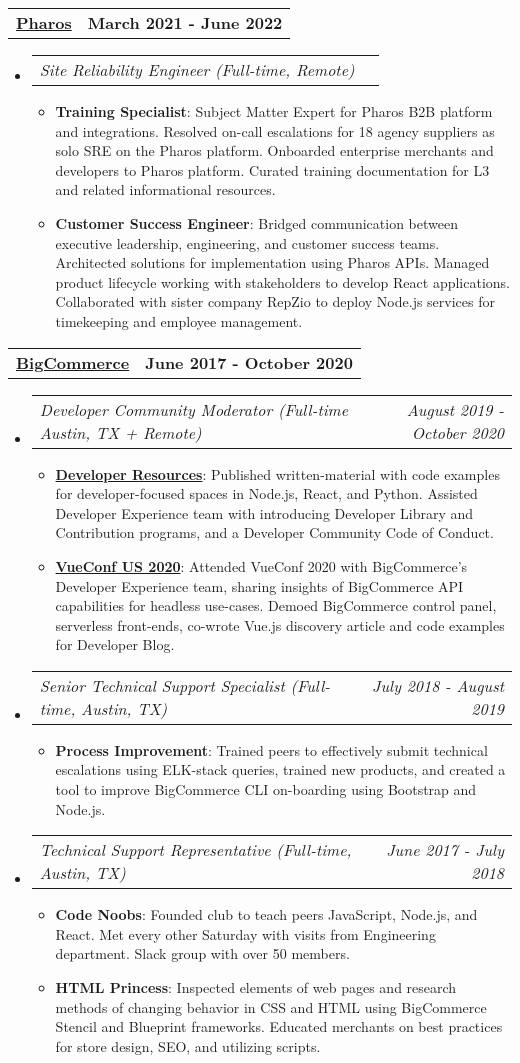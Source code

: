 \documentclass[letterpaper,10.8pt]{article}
\makeatletter
\newcommand{\resumeItem}[2]{
  \item\small{
    \textbf{#1}{: #2 \vspace{-2pt}}
  }
}
\newcommand{\jobLineItem}[2]{
  \vspace{0pt}\item[]
    \begin{tabular*}{0.98\textwidth}{l@{\extracolsep{\fill}}r}
      \textit{#1} & \textit{\small #2} \\
    \end{tabular*}\vspace{-4pt}
}
\newcommand{\employerTitle}[3]{
  \begin{tabular*}{1\textwidth}{l@{\extracolsep{\fill}}r}
    \href{#1}{\textbf{#2}} & \textbf{#3} \\
  \end{tabular*}\vspace{-4pt}
}
\newcommand{\resumeSubHeadingListStart}{\begin{itemize}[leftmargin=*]}
\newcommand{\resumeSubHeadingListEnd}{\end{itemize}}
\newcommand{\resumeItemListStart}{\begin{itemize}}
\newcommand{\resumeItemListEnd}{\end{itemize}\vspace{-5pt}}
\makeatother
\begin{document}
  \employerTitle
    {https://app.pharoscrm.com}{Pharos}{March 2021 - June 2022}
  \resumeSubHeadingListStart
    \jobLineItem
      {Site Reliability Engineer (Full-time, Remote)}{}
      \resumeItemListStart
        \resumeItem{Training Specialist}{Subject Matter Expert for Pharos B2B platform and integrations. Resolved on-call escalations for 18 agency suppliers as solo SRE on the Pharos platform. Onboarded enterprise merchants and developers to Pharos platform. Curated training documentation for L3 and related informational resources.}
        \resumeItem{Customer Success Engineer}{Bridged communication between executive leadership, engineering, and customer success teams. Architected solutions for implementation using Pharos APIs. Managed product lifecycle working with stakeholders to develop React applications. Collaborated with sister company RepZio to deploy Node.js services for timekeeping and employee management.}
      \resumeItemListEnd
  \resumeSubHeadingListEnd

  \employerTitle
    {https://bigcommerce.com}{BigCommerce}{June 2017 - October 2020}
  \resumeSubHeadingListStart
    \jobLineItem
        {Developer Community Moderator (Full-time Austin, TX + Remote)}{August 2019 - October 2020}
    \resumeItemListStart
        \resumeItem{\href{https://bigcommerce.github.io/dev-library/}{Developer Resources}}{Published written-material with code examples for developer-focused spaces in Node.js, React, and Python. Assisted Developer Experience team with introducing Developer Library and Contribution programs, and a Developer Community Code of Conduct.}
        \resumeItem{\href{https://medium.com/bigcommerce-developer-blog/introduction-to-vue-js-bigcommerce-b4388a2da4d2}{VueConf US 2020}}{Attended VueConf 2020 with BigCommerce’s Developer Experience team, sharing insights of BigCommerce API capabilities for headless use-cases. Demoed BigCommerce control panel, serverless front-ends, co-wrote Vue.js discovery article and code examples for Developer Blog.}
    \resumeItemListEnd
    \jobLineItem
        {Senior Technical Support Specialist (Full-time, Austin, TX)}{July 2018 - August 2019}
    \resumeItemListStart
        \resumeItem{Process Improvement}
        {Trained peers to effectively submit technical escalations using ELK-stack queries, trained new products, and created a tool to improve BigCommerce CLI on-boarding using Bootstrap and Node.js.}
      \resumeItemListEnd
    \jobLineItem
		    {Technical Support Representative (Full-time, Austin, TX)}{June 2017 - July 2018}
        \resumeItemListStart
        \resumeItem{Code Noobs}{Founded club to teach peers JavaScript, Node.js, and React. Met every other Saturday with visits from Engineering department. Slack group with over 50 members.}
        \resumeItem{HTML Princess}{Inspected elements of web pages and research methods of changing behavior in CSS and HTML using BigCommerce Stencil and Blueprint frameworks. Educated merchants on best practices for store design, SEO, and utilizing scripts.}
      \resumeItemListEnd
    \resumeSubHeadingListEnd
\end{document}
